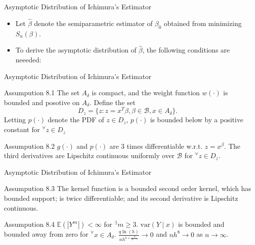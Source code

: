 \documentclass[xcolor=svgnames,dvipdfmx,cjk]{beamer}
\theoremstyle{example}
\def\var{\text{var}}
\def\E{\mathbb{E}}
\begin{document}
\begin{frame}{Asymptotic Distribution of Ichimura's Estimator}
  \begin{itemize}
    \item Let $\hat{\beta}$ denote the semiparametric estimator of $\beta_0$
          obtained from minimizing $S_n(\beta)$.
    \item To derive the asymptotic distribution of $\hat{\beta}$, the following conditions are neeeded:
  \end{itemize}
  \end{frame}
  
  
  \begin{frame}{Asymptotic Distribution of Ichimura's Estimator}
    \begin{itembox}[l]{Assumpution 8.1}
      The set $A_\delta$ is compact, 
      and the weight function $w(\cdot)$ is bounded and posotive on $A_\delta$.
      Define the set 
      \[D_z = \{ z: z=x^{T}\beta, \beta \in \mathcal{B}, x \in A_\delta \}.\]
      Letting $p(\cdot)$ denote the PDF of $z \in D_z$, 
      $p(\cdot)$ is bounded below by a positive constant for $^\forall z \in D_z$
    \end{itembox}
    \begin{itembox}[l]{Assumpution 8.2}
      $g(\cdot)$ and $p(\cdot)$ are 3 times differentiable w.r.t. $z=x^{\beta}$.
      The third derivatives are Lipschitz continuous uniformly over $\mathcal{B}$
      for $^{\forall} z \in D_z$. 
    \end{itembox}
  \end{frame}
  
  \begin{frame}{Asymptotic Distribution of Ichimura's Estimator}
    \begin{itembox}[l]{Assumpution 8.3} 
      The kernel function is a bounded second order kernel, which has bounded support;
      is twice differentiable; 
      and its second derivative is Lipschitz continuous.
    \end{itembox}
    \begin{itembox}[l]{Assumpution 8.4}
      $\E(|Y^m|) < \infty$ for $^{\exists} m \geq 3$.
      $\var(Y \mid x)$ is bounded and 
      bounded away from zero for $^{\forall} x \in A_\delta$. 
      $\frac{q \ln(h)}{nh^{3 + \frac{3}{m-1}}} \to 0$ and 
      $ nh^8 \to 0$ as $n \to \infty$.
    \end{itembox}
  \end{frame}
  
\end{document}

